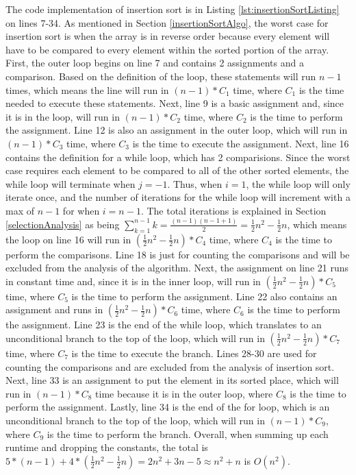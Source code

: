 \documentclass[letterpaper, 10pt,DIV=13]{scrartcl}
\numberwithin{equation}{section} %
\numberwithin{figure}{section} %
\numberwithin{table}{section} %
\begin{document}
The code implementation of insertion sort is in Listing \ref{lst:insertionSortListing} on lines 7-34. As mentioned in Section \ref{insertionSortAlgo}, the worst case for insertion sort is when the array is in reverse order because every element will have to be compared to every element within the sorted portion of the array. First, the outer loop begins on line 7 and contains 2 assignments and a comparison. Based on the definition of the loop, these statements will run $n - 1$ times, which means the line will run in $(n - 1) * C_{1}$ time, where $C_{1}$ is the time needed to execute these statements. Next, line 9 is a basic assignment and, since it is in the loop, will run in $(n - 1) * C_{2}$ time, where $C_{2}$ is the time to perform the assignment. Line 12 is also an assignment in the outer loop, which will run in $(n - 1) * C_{3}$ time, where $C_{3}$ is the time to execute the assignment. Next, line 16 contains the definition for a while loop, which has 2 comparisions. Since the worst case requires each element to be compared to all of the other sorted elements, the while loop will terminate when $j = -1$. Thus, when $i = 1$, the while loop will only iterate once, and the number of iterations for the while loop will increment with a max of $n - 1$ for when $i = n - 1$. The total iterations is explained in Section \ref{selectionAnalysis} as being $\sum_{k = 1} ^{n - 1} k = \frac{(n - 1)(n - 1 + 1)}{2} = \frac{1}{2}n^2 - \frac{1}{2}n$, which means the loop on line 16 will run in $(\frac{1}{2}n^2 - \frac{1}{2}n) * C_{4}$ time, where $C_{4}$ is the time to perform the comparisons. Line 18 is just for counting the comparisons and will be excluded from the analysis of the algorithm. Next, the assignment on line 21 runs in constant time and, since it is in the inner loop, will run in $(\frac{1}{2}n^2 - \frac{1}{2}n) * C_{5}$ time, where $C_{5}$ is the time to perform the assignment. Line 22 also contains an assignment and runs in $(\frac{1}{2}n^2 - \frac{1}{2}n) * C_{6}$ time, where $C_{6}$ is the time to perform the assignment. Line 23 is the end of the while loop, which translates to an unconditional branch to the top of the loop, which will run in $(\frac{1}{2}n^2 - \frac{1}{2}n) * C_{7}$ time, where $C_{7}$ is the time to execute the branch. Lines 28-30 are used for counting the comparisons and are excluded from the analysis of insertion sort. Next, line 33 is an assignment to put the element in its sorted place, which will run in $(n - 1) * C_{8}$ time because it is in the outer loop, where $C_{8}$ is the time to perform the assignment. Lastly, line 34 is the end of the for loop, which is an unconditional branch to the top of the loop, which will run in $(n - 1) * C_{9}$, where $C_{9}$ is the time to perform the branch. Overall, when summing up each runtime and dropping the constants, the total is $5 * (n - 1) + 4 * (\frac{1}{2}n^2 - \frac{1}{2}n) = 2n^2 + 3n - 5 \approx n^2 + n$ is $O(n^2)$.
\end{document}
